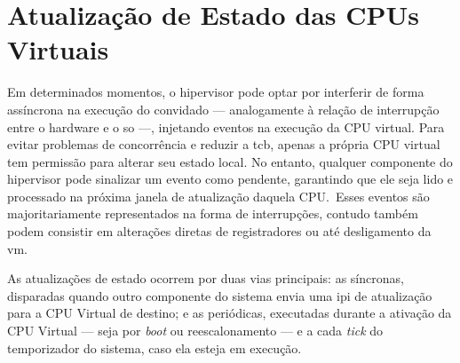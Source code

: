 \section{Atualização de Estado das CPUs Virtuais}

Em determinados momentos, o hipervisor pode optar por interferir de forma assíncrona na execução do convidado — analogamente à relação de interrupção entre o hardware e o \gls{so} —,
injetando eventos na execução da CPU virtual. 
Para evitar problemas de concorrência e reduzir a \gls{tcb}, apenas a própria CPU virtual tem permissão para alterar seu estado local. No entanto, qualquer componente do hipervisor pode
sinalizar um evento como pendente, garantindo que ele seja lido e processado na próxima janela de atualização daquela CPU.~Esses eventos são majoritariamente representados na forma de interrupções,
contudo também podem consistir em alterações diretas de registradores ou até desligamento da \gls{vm}.

As atualizações de estado ocorrem por duas vias principais: as síncronas, disparadas quando outro componente do sistema envia uma \gls{ipi} de atualização para a CPU Virtual de destino;
e as periódicas, executadas durante a ativação da CPU Virtual --- seja por \textit{boot} ou reescalonamento --- e a cada \textit{tick} do temporizador do sistema, caso ela esteja em execução.


